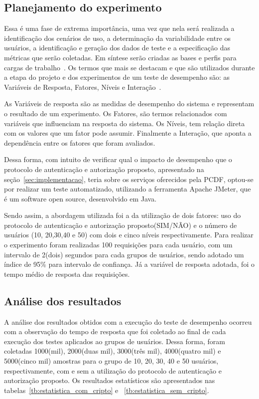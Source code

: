 \subsection{Planejamento do experimento}

Essa é uma fase de extrema importância, uma vez que nela será realizada a identificação dos cenários de uso, a determinação da variabilidade entre os usuários, a identificação e geração dos dados de teste e a especificação das métricas que serão coletadas. Em síntese serão criadas as bases e perfis para cargas de trabalho~\cite{Meier2007}.
Os termos que mais se destacam e que são utilizados durante a etapa do projeto e dos experimentos de um teste de desempenho são: as Variáveis de Resposta, Fatores, Níveis e Interação~\cite{jain1991art}.

As Variáveis de resposta são as medidas de desempenho do sistema e representam o resultado de um experimento. Os Fatores, são termos relacionados com variáveis que influenciam na resposta do sistema. Os Níveis, tem relação direta com os valores que um fator pode assumir. Finalmente a Interação, que aponta a dependência entre os fatores que foram avaliados.

Dessa forma, com intuito de verificar qual o impacto de desempenho que o protocolo de autenticação e autorização proposto, apresentado na seção~\ref{sec:implementacao}, teria sobre os serviços oferecidos pela PCDF, optou-se por realizar um teste automatizado, utilizando a ferramenta Apache JMeter, que é um software open source, desenvolvido em Java.

Sendo assim, a abordagem utilizada foi a da utilização de dois fatores: uso do protocolo de autenticação e autorização proposto(SIM/NÃO) e o número de usuários (10, 20,30,40 e 50) com dois e cinco níveis respectivamente. Para realizar o experimento foram realizadas 100 requisições para cada usuário, com um intervalo de 2(dois) segundos para cada grupos de usuários, sendo adotado um índice de 95\% para intervalo de confiança. Já a variável de resposta adotada, foi o tempo médio de resposta das requisições.

\subsection{Análise dos resultados}

A análise dos resultados obtidos com a execução do teste de desempenho ocorreu com a observação do tempo de resposta que foi coletado ao final de cada execução dos testes aplicados ao grupos de usuários. Dessa forma, foram coletadas 1000(mil), 2000(duas mil), 3000(três mil), 4000(quatro mil) e 5000(cinco mil) amostras para o grupo de 10, 20, 30, 40 e 50 usuários, respectivamente, com e sem a utilização do protocolo de autenticação e autorização proposto. Os resultados estatísticos são apresentados nas tabelas~\ref{tb:estatistica_com_cripto} e ~\ref{tb:estatistica_sem_cripto}.

